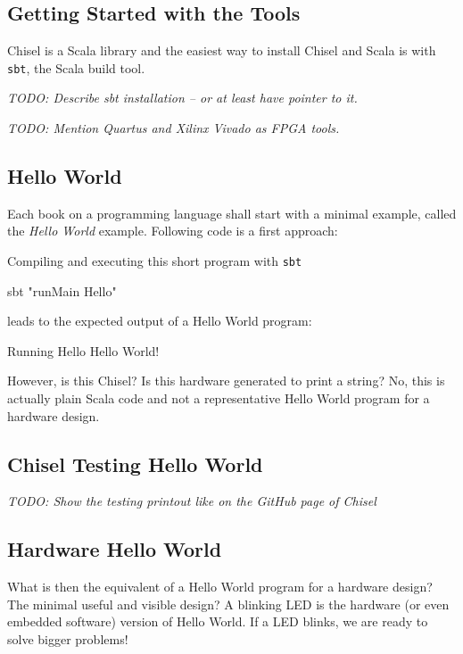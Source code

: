 \documentclass[a4paper]{article}
\newcommand{\code}[1]{{\small{\texttt{#1}}}}
\newcommand{\todo}[1]{{\emph{TODO: #1}}}
\begin{document}
\subsection{Getting Started with the Tools}

Chisel is a Scala library and the easiest way to install Chisel and Scala is
with \code{sbt}, the Scala build tool.

\todo{Describe sbt installation -- or at least have pointer to it.}

\todo{Mention Quartus and Xilinx Vivado as FPGA tools.}

\subsection{Hello World}

Each book on a programming language shall start with a minimal example,
called the \emph{Hello World} example. Following code is a first approach:





Compiling and executing this short program with \code{sbt}

\begin{chisel}
sbt "runMain Hello"
\end{chisel}

leads to the expected output of a Hello World program:

\begin{chisel}
[info] Running Hello 
Hello World!
\end{chisel}

However, is this Chisel? Is this hardware generated to print a string?
No, this is actually plain Scala code and not a representative Hello World
program for a hardware design.

\subsection{Chisel Testing Hello World}

\todo{Show the testing printout like on the GitHub page of Chisel}

\subsection{Hardware Hello World}

What is then the equivalent of a Hello World program for a hardware design?
The minimal useful and visible design? A blinking LED is the hardware (or even
embedded software) version of Hello World. If a LED blinks, we are ready to
solve bigger problems!
\end{document}
